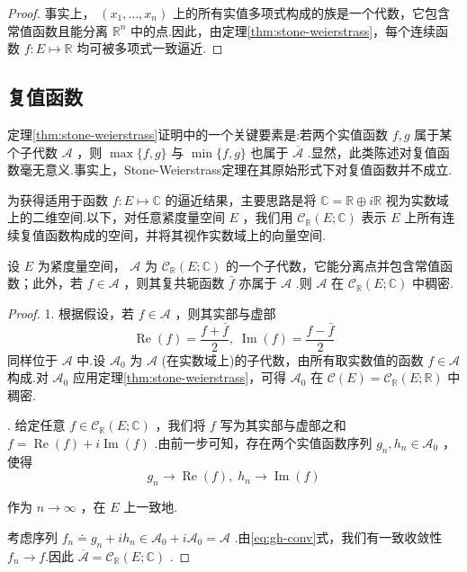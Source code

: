 \begin{proof}
事实上， $\left( {{x}_{1},\ldots ,{x}_{n}}\right)$ 上的所有实值多项式构成的族是一个代数，它包含常值函数且能分离 ${\mathbb{R}}^{n}$ 中的点.因此，由定理\ref{thm:stone-weierstrass}，每个连续函数 $f : E \mapsto  \mathbb{R}$ 均可被多项式一致逼近.
\end{proof}

\subsection{复值函数}

定理\ref{thm:stone-weierstrass}证明中的一个关键要素是:若两个实值函数 $f,g$ 属于某个子代数 $\mathcal{A}$ ，则 $\max \{ f,g\}$ 与 $\min \{ f,g\}$ 也属于 $\overline{\mathcal{A}}$ .显然，此类陈述对复值函数毫无意义.事实上，Stone-Weierstrass定理在其原始形式下对复值函数并不成立.

为获得适用于函数 $f : E \mapsto  \mathbb{C}$ 的逼近结果，主要思路是将 $\mathbb{C} = \mathbb{R} \oplus  i\mathbb{R}$ 视为实数域上的二维空间.以下，对任意紧度量空间 $E$ ，我们用 ${\mathcal{C}}_{\mathbb{R}}\left( {E;\mathbb{C}}\right)$ 表示 $E$ 上所有连续复值函数构成的空间，并将其视作实数域上的向量空间.

\begin{theorem}\label{thm:stone-weierstrass-complex}
设 $E$ 为紧度量空间， $\mathcal{A}$ 为 ${\mathcal{C}}_{\mathbb{R}}\left( {E;\mathbb{C}}\right)$ 的一个子代数，它能分离点并包含常值函数；此外，若 $f \in  \mathcal{A}$ ，则其复共轭函数 $\bar{f}$ 亦属于 $\mathcal{A}$ .则 $\mathcal{A}$ 在 ${\mathcal{C}}_{\mathbb{R}}\left( {E;\mathbb{C}}\right)$ 中稠密.
\end{theorem}

\begin{proof}
1. 根据假设，若 $f \in  \mathcal{A}$ ，则其实部与虚部
\[
\operatorname{Re}\left( f\right)  = \frac{f + \bar{f}}{2},\;\operatorname{Im}\left( f\right)  = \frac{f - \bar{f}}{2}
\]
同样位于 $\mathcal{A}$ 中.设 ${\mathcal{A}}_{0}$ 为 $\mathcal{A}$ (在实数域上)的子代数，由所有取实数值的函数 $f \in  \mathcal{A}$ 构成.对 ${\mathcal{A}}_{0}$ 应用定理\ref{thm:stone-weierstrass}，可得 ${\mathcal{A}}_{0}$ 在 $\mathcal{C}\left( E\right)  = {\mathcal{C}}_{\mathbb{R}}\left( {E;\mathbb{R}}\right)$ 中稠密.

. 给定任意 $f \in  {\mathcal{C}}_{\mathbb{R}}\left( {E;\mathbb{C}}\right)$ ，我们将 $f$ 写为其实部与虚部之和 $f = \operatorname{Re}\left( f\right)  + i\operatorname{Im}\left( f\right)$ .由前一步可知，存在两个实值函数序列 ${g}_{n},{h}_{n} \in  {\mathcal{A}}_{0}$ ，使得
\begin{equation}\tag{3.4}\label{eq:gh-conv}
{g}_{n} \rightarrow  \operatorname{Re}\left( f\right) ,\;{h}_{n} \rightarrow  \operatorname{Im}\left( f\right)
\end{equation}

作为 $n \rightarrow  \infty$ ，在 $E$ 上一致地.

考虑序列 ${f}_{n} \doteq  {g}_{n} + i{h}_{n} \in  {\mathcal{A}}_{0} + i{\mathcal{A}}_{0} = \mathcal{A}$ .由\eqref{eq:gh-conv}式，我们有一致收敛性 ${f}_{n} \rightarrow  f$.因此 $\overline{\mathcal{A}} = {\mathcal{C}}_{\mathbb{R}}\left( {E;\mathbb{C}}\right)$ .
\end{proof}

